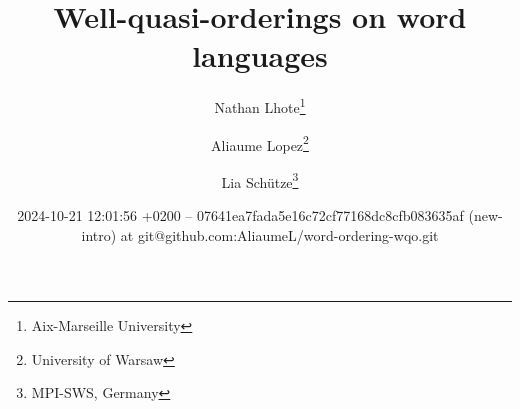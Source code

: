 %

\title{Well-quasi-orderings on word languages}
\author{%
        Nathan Lhote\thanks{Aix-Marseille University}
     \and
        Aliaume Lopez\thanks{University of Warsaw}
     \and
        Lia Schütze\thanks{MPI-SWS, Germany}
    }

\date{2024-10-21 12:01:56
+0200 -- 07641ea7fada5e16c72cf77168dc8cfb083635af (new-intro) at git@github.com:AliaumeL/word-ordering-wqo.git}

\newcommand{\makeabstract}{
\begin{abstract}
    The set of finite words over a well-quasi-ordered set is itself
    well-quasi-ordered. This seminal result by Higman is a cornerstone
    of the theory of well-quasi-orderings and has found numerous
    applications in computer science. However, this result is based on a
    specific choice of ordering on words, the (scattered) subword
    ordering. In this paper, we describe to what extent other natural
    orderings (prefix, suffix, and infix) on words can be used to derive
    Higman-like theorems. More specifically, we are interested in
    characterizing \emph{languages} of words that are well-quasi-ordered
    under these orderings. We show that a simple characterization is
    possible for the prefix and suffix orderings, and that under extra
    regularity assumptions, this also extends to the infix ordering.
\end{abstract}
}
